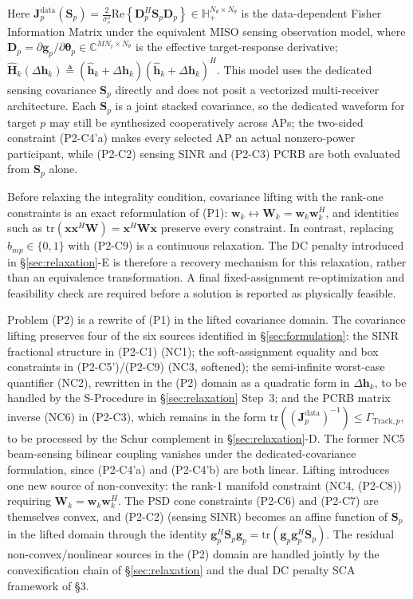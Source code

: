 \documentclass[12pt,a4paper]{article}
\newcommand{\vect}[1]{\mathbf{#1}}
\newcommand{\mat}[1]{\mathbf{#1}}
\newcommand{\tr}{\text{tr}}
\newcommand{\Real}{\text{Re}}
\begin{document}
Here $\mat{J}_p^{\text{data}}(\mat{S}_p) = \frac{2}{\sigma_s^2} \Real\!\left\{ \mat{D}_p^H \mat{S}_p \mat{D}_p \right\} \in \mathbb{H}_+^{N_\theta \times N_\theta}$ is the data-dependent Fisher Information Matrix under the equivalent MISO sensing observation model, where $\mat{D}_p = \partial \vect{g}_p / \partial \boldsymbol{\theta}_p \in \mathbb{C}^{MN_t \times N_\theta}$ is the effective target-response derivative; $\hat{\mat{H}}_k(\Delta\vect{h}_k) \triangleq (\hat{\vect{h}}_k + \Delta\vect{h}_k)(\hat{\vect{h}}_k + \Delta\vect{h}_k)^H$. This model uses the dedicated sensing covariance $\mat{S}_p$ directly and does not posit a vectorized multi-receiver architecture. Each $\mat{S}_p$ is a joint stacked covariance, so the dedicated waveform for target $p$ may still be synthesized cooperatively across APs; the two-sided constraint (P2-C4'a) makes every selected AP an actual nonzero-power participant, while (P2-C2) sensing SINR and (P2-C3) PCRB are both evaluated from $\mat{S}_p$ alone.

Before relaxing the integrality condition, covariance lifting with the rank-one constraints is an exact reformulation of (P1): $\vect{w}_k \leftrightarrow \mat{W}_k=\vect{w}_k\vect{w}_k^H$, and identities such as $\tr(\vect{x}\vect{x}^H\mat{W})=\vect{x}^H\mat{W}\vect{x}$ preserve every constraint. In contrast, replacing $b_{mp}\in\{0,1\}$ with (P2-C9) is a continuous relaxation. The DC penalty introduced in \S\ref{sec:relaxation}-E is therefore a recovery mechanism for this relaxation, rather than an equivalence transformation. A final fixed-assignment re-optimization and feasibility check are required before a solution is reported as physically feasible.

Problem (P2) is a rewrite of (P1) in the lifted covariance domain. The covariance lifting preserves four of the six sources identified in \S\ref{sec:formulation}: the SINR fractional structure in (P2-C1) (NC1); the soft-assignment equality and box constraints in (P2-C5')/(P2-C9) (NC3, softened); the semi-infinite worst-case quantifier (NC2), rewritten in the (P2) domain as a quadratic form in $\Delta\vect{h}_k$, to be handled by the S-Procedure in \S\ref{sec:relaxation} Step~3; and the PCRB matrix inverse (NC6) in (P2-C3), which remains in the form $\tr((\mat{J}_p^{\text{data}})^{-1}) \leq \Gamma_{\text{Track},p}$, to be processed by the Schur complement in \S\ref{sec:relaxation}-D. The former NC5 beam-sensing bilinear coupling vanishes under the dedicated-covariance formulation, since (P2-C4'a) and (P2-C4'b) are both linear. Lifting introduces one new source of non-convexity: the rank-1 manifold constraint (NC4, (P2-C8)) requiring $\mat{W}_k = \vect{w}_k \vect{w}_k^H$. The PSD cone constraints (P2-C6) and (P2-C7) are themselves convex, and (P2-C2) (sensing SINR) becomes an affine function of $\mat{S}_p$ in the lifted domain through the identity $\vect{g}_p^H \mat{S}_p \vect{g}_p = \tr(\vect{g}_p \vect{g}_p^H \mat{S}_p)$. The residual non-convex/nonlinear sources in the (P2) domain are handled jointly by the convexification chain of \S\ref{sec:relaxation} and the dual DC penalty SCA framework of \S3.
\end{document}
